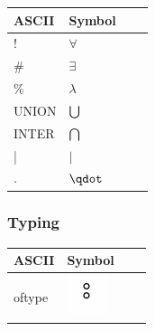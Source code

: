 \begin{center}
    \begin{tabular}{ | l | l | l | p{5cm} |}
    \hline
	ASCII & Symbol \\ \hline
	! & $\forall$ \\ \hline
	\# & $\exists$ \\ \hline
	\% & $\lambda$ \\ \hline
	UNION & $\bigcup\nolimits$ \\ \hline
	INTER & $\bigcap\nolimits$ \\ \hline
	| & $|$ \\ \hline
	. & $\qdot$ \\ \hline
    \end{tabular}
\end{center}

\subsubsection{Typing}

\begin{center}
    \begin{tabular}{ | l | l | l | p{5cm} |}
    \hline
	ASCII & Symbol \\ \hline
	oftype & \includegraphics[]{img/reference/ref_03_offtype_symbol.png} \\ \hline
    \end{tabular}
\end{center}

